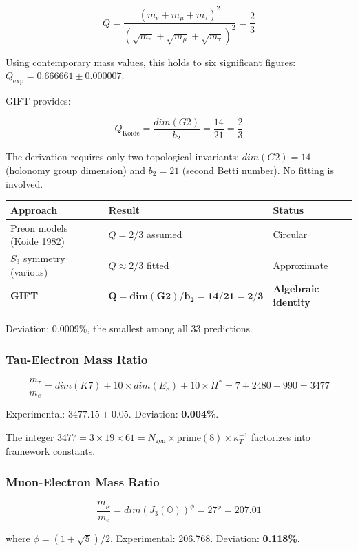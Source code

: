 \documentclass[11pt,a4paper]{article}
\newcommand{\E}{\mathrm{E}}
\newcommand{\Gtwo}{\mathrm{G}_2}
\newcommand{\Kseven}{K_7}
\newcommand{\dimE}{\mathrm{dim}}
\def\Gtwo{G2}%
\def\Kseven{K7}%
\def\E{E}%
\def\dimE{dim}%
\begin{document}
$$Q = \frac{(m_e + m_\mu + m_\tau)^2}{(\sqrt{m_e} + \sqrt{m_\mu} + \sqrt{m_\tau})^2} = \frac{2}{3}$$

Using contemporary mass values, this holds to six significant figures: $Q_{\mathrm{exp}} = 0.666661 \pm 0.000007$.

GIFT provides:

$$Q_{\mathrm{Koide}} = \frac{\dimE(\Gtwo)}{b_2} = \frac{14}{21} = \frac{2}{3}$$

The derivation requires only two topological invariants: $\dimE(\Gtwo) = 14$ (holonomy group dimension) and $b_2 = 21$ (second Betti number). No fitting is involved.

\begin{table}[H]
\centering
\begin{tabular}{lll}
\toprule
Approach & Result & Status \\
\midrule
Preon models (Koide 1982) & $Q = 2/3$ assumed & Circular \\
$S_3$ symmetry (various) & $Q \approx 2/3$ fitted & Approximate \\
\textbf{GIFT} & $\mathbf{Q = \dimE(\Gtwo)/b_2 = 14/21 = 2/3}$ & \textbf{Algebraic identity} \\
\bottomrule
\end{tabular}
\end{table}

Deviation: 0.0009\%, the smallest among all 33 predictions.

\subsubsection{Tau-Electron Mass Ratio}

$$\frac{m_\tau}{m_e} = \dimE(\Kseven) + 10 \times \dimE(\E_8) + 10 \times H^* = 7 + 2480 + 990 = 3477$$

Experimental: $3477.15 \pm 0.05$. Deviation: \textbf{0.004\%}.

The integer $3477 = 3 \times 19 \times 61 = N_{\mathrm{gen}} \times \mathrm{prime}(8) \times \kappa_T^{-1}$ factorizes into framework constants.

\subsubsection{Muon-Electron Mass Ratio}

$$\frac{m_\mu}{m_e} = \dimE(J_3(\mathbb{O}))^\phi = 27^\phi = 207.01$$

where $\phi = (1+\sqrt{5})/2$. Experimental: 206.768. Deviation: \textbf{0.118\%}.
\end{document}

